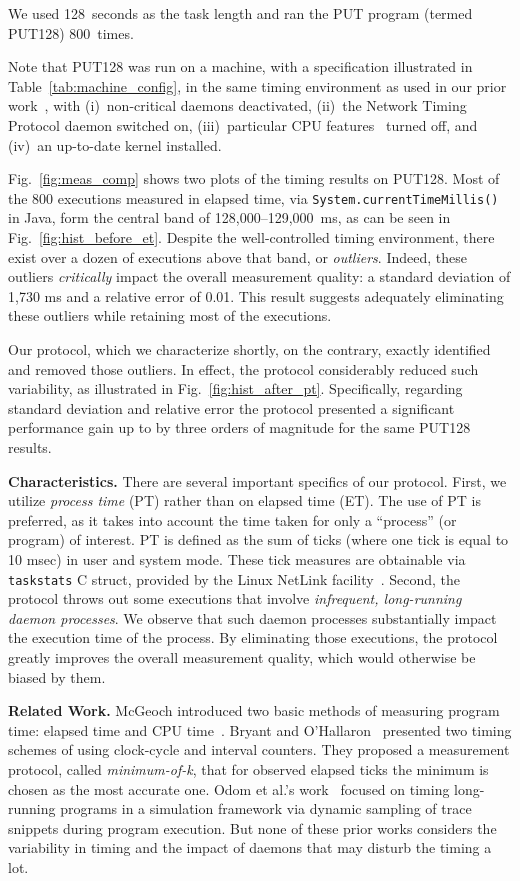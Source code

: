\documentclass[letter]{ieice}
\begin{document}
We used 128~seconds as the task length and ran the PUT program (termed PUT128) 
800~times. 
{\color{blue}
Note that PUT128 was run on a machine, with 
a specification illustrated in Table~\ref{tab:machine_config}, 
in the same timing environment as used in our prior work~\cite{Currim}, 
with (i)~non-critical daemons deactivated, 
(ii)~the Network Timing Protocol daemon switched on,  
(iii)~particular CPU features~\cite{intel15,intelSpeed15} turned off, 
and (iv)~an up-to-date kernel installed.

Fig.~\ref{fig:meas_comp} shows two plots of the timing results on PUT128.
Most of the 800 executions measured in elapsed time, 
via  {\tt System.currentTimeMillis()} in Java, form the central band 
of \hbox{128,000--129,000 ms,} as can be seen in Fig.~\ref{fig:hist_before_et}. 
Despite the well-controlled timing environment, there exist over a dozen of executions above that band, or {\em outliers}. Indeed, these outliers {\em critically} impact the overall measurement quality: a standard deviation of 1,730 ms and a relative error of 0.01. This result suggests adequately eliminating these outliers while retaining most of the executions.

Our protocol, which we characterize shortly, on the contrary, 
exactly identified and removed those outliers. 
In effect, the protocol considerably reduced such variability, 
as illustrated in Fig.~\ref{fig:hist_after_pt}. 
Specifically, regarding standard deviation and relative error 
the protocol presented a significant performance gain up to by 
three orders of magnitude for the same PUT128 results.

{\bf Characteristics.} There are several important specifics of our protocol. 
First, we utilize {\em process time} (PT) rather than on elapsed time (ET). 
The use of PT is preferred, as it takes into account 
the time taken for only a ``process'' (or program) of interest.
PT is defined as the sum of ticks (where one tick is equal to 10 msec)
in user and system mode. 
These tick measures are obtainable via {\tt taskstats} C struct, 
provided by the Linux NetLink facility~\cite{Netlink}. 
Second, the protocol throws out some executions that involve
{\em infrequent, \hbox{long-running} daemon processes}. 
We observe that such daemon processes substantially impact 
the execution time of the process.  
By eliminating those executions, the protocol greatly improves
the overall measurement quality, which would otherwise be biased by them.
}

{\bf Related Work.} 
McGeoch introduced
two basic methods of measuring program time: elapsed time and CPU time~\cite{Mcgeoch12}. 
Bryant and O'Hallaron~\cite{Randal03} 
presented two timing schemes of using clock-cycle and interval counters. 
They proposed a measurement protocol, called {\em minimum-of-k}, 
that for observed elapsed ticks the minimum is chosen as the most accurate one. 
Odom et al.'s work~\cite{Odom05} focused on timing long-running programs 
in a simulation framework via dynamic sampling of trace snippets during program execution. 
But none of these prior works considers the variability in 
timing and the impact of daemons that may disturb the timing a lot.
\end{document}
